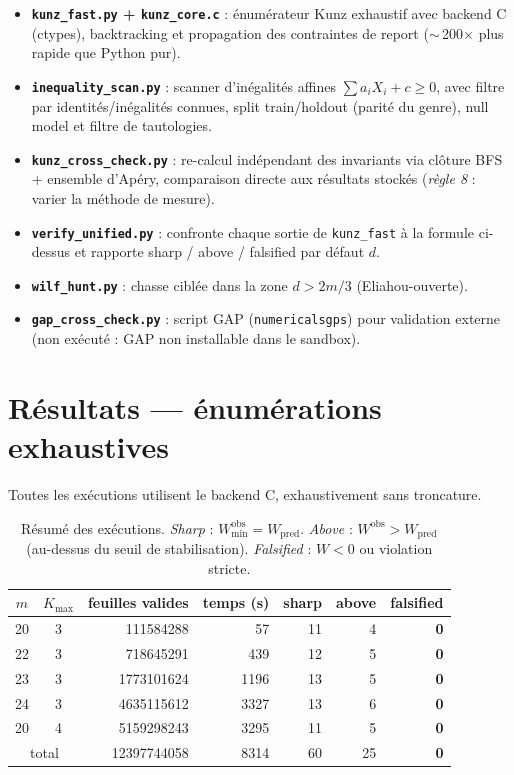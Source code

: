 \documentclass[11pt,a4paper]{article}
\begin{document}
\begin{itemize}
  \item \textbf{\texttt{kunz\_fast.py} + \texttt{kunz\_core.c}} : énumérateur
  Kunz exhaustif avec backend C (ctypes), backtracking et propagation
  des contraintes de report ($\sim$\,200$\times$ plus rapide que Python pur).
  \item \textbf{\texttt{inequality\_scan.py}} : scanner d'inégalités affines
  $\sum a_i X_i + c\ge 0$, avec filtre par identités/inégalités connues,
  split train/holdout (parité du genre), null model et filtre de tautologies.
  \item \textbf{\texttt{kunz\_cross\_check.py}} : re-calcul indépendant des
  invariants via clôture BFS + ensemble d'Apéry, comparaison directe aux
  résultats stockés (\emph{règle 8} : varier la méthode de mesure).
  \item \textbf{\texttt{verify\_unified.py}} : confronte chaque
  sortie de \texttt{kunz\_fast} à la formule ci-dessus et rapporte
  sharp / above / falsified par défaut $d$.
  \item \textbf{\texttt{wilf\_hunt.py}} : chasse ciblée dans la zone
  $d>2m/3$ (Eliahou-ouverte).
  \item \textbf{\texttt{gap\_cross\_check.py}} : script GAP
  (\texttt{numericalsgps}) pour validation externe (non exécuté : GAP
  non installable dans le sandbox).
\end{itemize}

\section{Résultats --- énumérations exhaustives}

Toutes les exécutions utilisent le backend C, exhaustivement sans
troncature.

\begin{table}[h]
\centering
\begin{tabular}{ccrrrrr}
\toprule
$m$ & $K_{\max}$ & feuilles valides & temps (s) & sharp & above & \textbf{falsified} \\
\midrule
20 & 3 & \num{111584288}   & 57    & 11 & 4 & \textbf{0} \\
22 & 3 & \num{718645291}   & 439   & 12 & 5 & \textbf{0} \\
23 & 3 & \num{1773101624}  & 1196  & 13 & 5 & \textbf{0} \\
24 & 3 & \num{4635115612}  & 3327  & 13 & 6 & \textbf{0} \\
20 & 4 & \num{5159298243}  & 3295  & 11 & 5 & \textbf{0} \\
\midrule
\multicolumn{2}{c}{total} & \num{12397744058} & \num{8314} & 60 & 25 & \textbf{0} \\
\bottomrule
\end{tabular}
\caption{Résumé des exécutions. \emph{Sharp} : $W_{\min}^{\text{obs}}=W_{\mathrm{pred}}$.
\emph{Above} : $W^{\text{obs}}>W_{\mathrm{pred}}$ (au-dessus du seuil de stabilisation).
\emph{Falsified} : $W<0$ ou violation stricte.}
\end{table}
\end{document}
